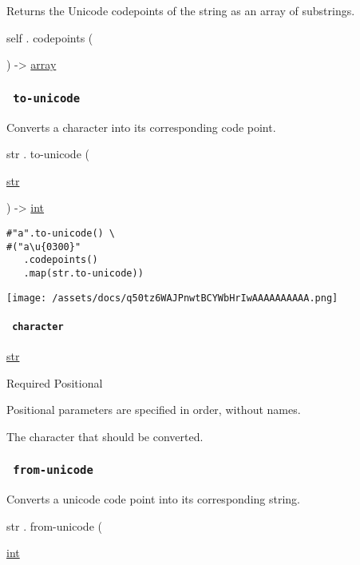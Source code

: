 Returns the Unicode codepoints of the string as an array of substrings.

self { . } { codepoints } (

) -\textgreater{} \href{/docs/reference/foundations/array/}{array}

\subsubsection{\texorpdfstring{\texttt{\ to-unicode\ }}{ to-unicode }}\label{definitions-to-unicode}

Converts a character into its corresponding code point.

str { . } { to-unicode } (

{ \href{/docs/reference/foundations/str/}{str} }

) -\textgreater{} \href{/docs/reference/foundations/int/}{int}

\begin{verbatim}
#"a".to-unicode() \
#("a\u{0300}"
   .codepoints()
   .map(str.to-unicode))
\end{verbatim}

\texttt{[image: /assets/docs/q50tz6WAJPnwtBCYWbHrIwAAAAAAAAAA.png]}

\paragraph{\texorpdfstring{\texttt{\ character\ }}{ character }}\label{definitions-to-unicode-character}

\href{/docs/reference/foundations/str/}{str}

{Required} {{ Positional }}

\label{definitions-to-unicode-character-positional-tooltip}
Positional parameters are specified in order, without names.

The character that should be converted.

\subsubsection{\texorpdfstring{\texttt{\ from-unicode\ }}{ from-unicode }}\label{definitions-from-unicode}

Converts a unicode code point into its corresponding string.

str { . } { from-unicode } (

{ \href{/docs/reference/foundations/int/}{int} }

